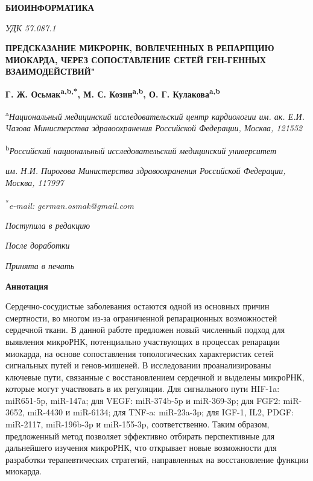 \begin{center}
\textbf{БИОИНФОРМАТИКА}

\vspace{0.5cm}

\textit{УДК 57.087.1}

\vspace{1cm}

\textbf{ПРЕДСКАЗАНИЕ МИКРОРНК, ВОВЛЕЧЕННЫХ В РЕПАРПЦИЮ МИОКАРДА, ЧЕРЕЗ СОПОСТАВЛЕНИЕ СЕТЕЙ ГЕН-ГЕННЫХ ВЗАИМОДЕЙСТВИЙ"}

\vspace{1cm}

\textbf{Г. Ж. Осьмак\textsuperscript{a,b,*}, М. С. Козин\textsuperscript{a,b}, О. Г. Кулакова\textsuperscript{a,b}}

\vspace{0.5cm}

\footnotesize
\textsuperscript{a}\textit{Национальный медицинский исследовательский центр кардиологии им. ак. Е.И. Чазова Министерства здравоохранения Российской Федерации, Москва, 121552}

\textsuperscript{b}\textit{Российский национальный исследовательский медицинский университет}

\textit{им. Н.И. Пирогова Министерства здравоохранения Российской Федерации, Москва, 117997}

\vspace{0.5cm}

\textsuperscript{*}\textit{e-mail: german.osmak@gmail.com}

\normalsize
\end{center}

\vspace{0.5cm}

\begin{center}
\textit{Поступила в редакцию}

\textit{После доработки}

\textit{Принята в печать}
\end{center}

\vspace{0.5cm}

\textbf{Аннотация} 

Сердечно-сосудистые заболевания остаются одной из основных причин смертности, во многом из-за ограниченной репарационных возможностей сердечной ткани. В данной работе предложен новый численный подход для выявления микроРНК, потенциально участвующих в процессах репарации миокарда, на основе сопоставления топологических характеристик сетей сигнальных путей и генов-мишеней. В исследовании проанализированы ключевые пути, связанные с восстановлением сердечной и выделены микроРНК, которые могут участвовать в их регуляции. Для сигнального пути HIF-1a: miR651-5p, miR-147a; для VEGF: miR-374b-5p и miR-369-3p; для FGF2: miR-3652, miR-4430 и miR-6134; для TNF-a: miR-23a-3p; для  IGF-1, IL2, PDGF: miR-2117, miR-196b-3p и miR-155-3p, соответственно. Таким образом, предложенный метод позволяет эффективно отбирать перспективные для дальнейшего изучения микроРНК, что открывает новые возможности для разработки терапевтических стратегий, направленных на восстановление функции миокарда.

